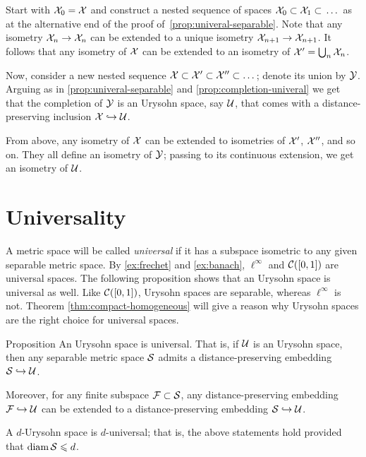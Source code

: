 Start with $\mathcal{X}_0=\mathcal{X}$ and construct a nested sequence of spaces $\mathcal{X}_0\subset\mathcal{X}_1 \subset{}\dots$ as at the alternative end of the proof of~\ref{prop:univeral-separable}.
Note that 
any isometry $\mathcal{X}_n\to \mathcal{X}_n$ can be extended to a unique isometry $\mathcal{X}_{n+1}\to \mathcal{X}_{n+1}$.
It follows that any isometry of $\mathcal{X}$ can be extended to an isometry of $\mathcal{X}'=\bigcup_n\mathcal{X}_n$.

Now, consider a new nested sequence $\mathcal{X}\subset \mathcal{X}'\subset \mathcal{X}''\subset \dots$;
denote its union by $\mathcal{Y}$.
Arguing as in \ref{prop:univeral-separable} and \ref{prop:completion-univeral} we get that the completion of $\mathcal{Y}$ is an Urysohn space, say $\mathcal{U}$, that comes with a distance-preserving inclusion $\mathcal{X}\hookrightarrow \mathcal{U}$.

From above, any isometry of $\mathcal{X}$ can be extended to isometries of $\mathcal{X}'$, $\mathcal{X}''$, and so on.
They all define an isometry of $\mathcal{Y}$;
passing to its continuous extension, we get an isometry of $\mathcal{U}$.
\qeds


\section{Universality}

A metric space will be called \emph{universal} if it has a subspace isometric to any given separable metric space.
By \ref{ex:frechet} and \ref{ex:banach},  $\ell^\infty$ and $\mathcal{C}([0,1])$ are universal spaces.
The following proposition shows that an Urysohn space is universal as well.
Like $\mathcal{C}([0,1])$, Urysohn spaces are separable, whereas $\ell^\infty$ is not.
Theorem \ref{thm:compact-homogeneous} will give a reason why Urysohn spaces are the right choice for universal spaces.

\begin{thm}{Proposition}\label{prop:sep-in-urys}
An Urysohn space is universal.
That is, if $\mathcal{U}$ is an Urysohn space, then any separable metric space $\mathcal{S}$ admits a distance-preserving embedding $\mathcal{S}\hookrightarrow\mathcal{U}$.

Moreover, for any finite subspace $\mathcal{F}\subset \mathcal{S}$,
any distance-preserving embedding $\mathcal{F}\hookrightarrow \mathcal{U}$ can be extended to a distance-preserving embedding $\mathcal{S}\hookrightarrow\mathcal{U}$.

A $d$-Urysohn space is $d$-universal;
that is, the above statements hold provided that $\operatorname{\rm diam}\nolimits\mathcal{S}\leqslant d$.  
\end{thm}

